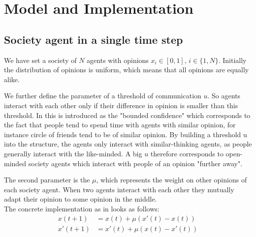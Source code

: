 \documentclass[11pt]{article}
\begin{document}
\section{Model and Implementation}
\subsection{Society agent in a single time step}
We have set a society of $N$ agents with opinions $x_i \in [0,1]$, $i \in \{1, N \}$. Initially the distribution of opinions is uniform, which means that all opinions are equally alike.

We further define the parameter of a threshold of communication $u$. So agents interact with each other only if their difference in opinion is smaller than this threshold. In \cite{Minor} this is introduced as the "bounded confidence" which corresponds to the fact that people tend to spend time with agents with similar opinion, for instance circle of friends tend to be of similar opinion. By building a threshold u into the structure, the agents only interact with similar-thinking agents, as people generally interact with the like-minded. A big $u$ therefore corresponds to open-minded society agents which interact with people of an opinion "further away".

The second parameter is the $\mu$, which represents the weight on other opinions of each society agent. When two agents interact with each other they mutually adapt their opinion to some opinion in the middle. \\

The concrete implementation as in \cite{Minor} looks as follows:
\begin{equation}
\begin{aligned}
x(t+1) &= x(t) + \mu(x'(t) - x(t))  \\
x'(t+1) &= x'(t) + \mu(x(t) - x'(t)) 
\end{aligned}
\end{equation}
\end{document}
